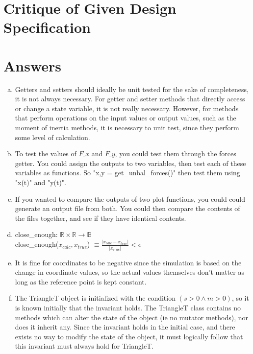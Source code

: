 \documentclass[12pt]{article}
\begin{document}
\section{Critique of Given Design Specification}


\section{Answers}

\begin{enumerate}[a)]

\item Getters and setters should ideally be unit tested for the sake of completeness, it is not always necessary. For getter and setter methods that directly access or change a state variable, it is not really necessary. However, for methods that perform operations on the input values or output values, such as the moment of inertia methods, it is necessary to unit test, since they perform some level of calculation.

\item To test the values of $F\_x$ and $F\_y$, you could test them through the forces getter. You could assign the outputs to two variables, then test each of these variables as functions. So "x,y = get\_unbal\_forces()" then test them using "x(t)" and "y(t)".

\item If you wanted to compare the outputs of two plot functions, you could could generate an output file from both. You could then compare the contents of the files together, and see if they have identical contents.

\item close\_enough: $\mathbb{R} \times \mathbb{R} \rightarrow \mathbb{B}$ \\
close\_enough($x_{calc} , x_{true}$) $\equiv \frac{|x_{calc} - x_{true}|}{|x_{true}|} < \epsilon$

\item It is fine for coordinates to be negative since the simulation is based on the change in coordinate values, so the actual values themselves don't matter as long as the reference point is kept constant.

\item The TriangleT object is initialized with the condition $(s > 0 \land m > 0)$, so it is known initially that the invariant holds. The TriangleT class contains no methods which can alter the state of the object (ie no mutator methods), nor does it inherit any. Since the invariant holds in the initial case, and there exists no way to modify the state of the object, it must logically follow that this invariant must always hold for TriangleT.


\end{enumerate}
\end{document}
